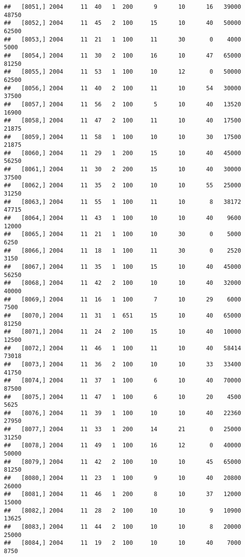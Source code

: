 \documentclass{article}\usepackage[]{graphicx}\usepackage[]{color}
\makeatletter
\newenvironment{kframe}{%
 \def\at@end@of@kframe{}%
 \ifinner\ifhmode%
  \def\at@end@of@kframe{\end{minipage}}%
  \begin{minipage}{\columnwidth}%
 \fi\fi%
 \def\FrameCommand##1{\hskip\@totalleftmargin \hskip-\fboxsep
 \colorbox{shadecolor}{##1}\hskip-\fboxsep
     \hskip-\linewidth \hskip-\@totalleftmargin \hskip\columnwidth}%
 \MakeFramed {\advance\hsize-\width
   \@totalleftmargin\z@ \linewidth\hsize
   \@setminipage}}%
 {\par\unskip\endMakeFramed%
 \at@end@of@kframe}
\newenvironment{knitrout}{}{} %
\makeatother
\begin{document}
\begin{knitrout}
\begin{kframe}
\begin{verbatim}
##   [8051,] 2004     11  40   1  200      9      10      16   39000   48750
##   [8052,] 2004     11  45   2  100     15      10      40   50000   62500
##   [8053,] 2004     11  21   1  100     11      30       0    4000    5000
##   [8054,] 2004     11  30   2  100     16      10      47   65000   81250
##   [8055,] 2004     11  53   1  100     10      12       0   50000   62500
##   [8056,] 2004     11  40   2  100     11      10      54   30000   37500
##   [8057,] 2004     11  56   2  100      5      10      40   13520   16900
##   [8058,] 2004     11  47   2  100     11      10      40   17500   21875
##   [8059,] 2004     11  58   1  100     10      10      30   17500   21875
##   [8060,] 2004     11  29   1  200     15      10      40   45000   56250
##   [8061,] 2004     11  30   2  200     15      10      40   30000   37500
##   [8062,] 2004     11  35   2  100     10      10      55   25000   31250
##   [8063,] 2004     11  55   1  100     11      10       8   38172   47715
##   [8064,] 2004     11  43   1  100     10      10      40    9600   12000
##   [8065,] 2004     11  21   1  100     10      30       0    5000    6250
##   [8066,] 2004     11  18   1  100     11      30       0    2520    3150
##   [8067,] 2004     11  35   1  100     15      10      40   45000   56250
##   [8068,] 2004     11  42   2  100     10      10      40   32000   40000
##   [8069,] 2004     11  16   1  100      7      10      29    6000    7500
##   [8070,] 2004     11  31   1  651     15      10      40   65000   81250
##   [8071,] 2004     11  24   2  100     15      10      40   10000   12500
##   [8072,] 2004     11  46   1  100     11      10      40   58414   73018
##   [8073,] 2004     11  36   2  100     10      10      33   33400   41750
##   [8074,] 2004     11  37   1  100      6      10      40   70000   87500
##   [8075,] 2004     11  47   1  100      6      10      20    4500    5625
##   [8076,] 2004     11  39   1  100     10      10      40   22360   27950
##   [8077,] 2004     11  33   1  200     14      21       0   25000   31250
##   [8078,] 2004     11  49   1  100     16      12       0   40000   50000
##   [8079,] 2004     11  42   2  100     10      10      45   65000   81250
##   [8080,] 2004     11  23   1  100      9      10      40   20800   26000
##   [8081,] 2004     11  46   1  200      8      10      37   12000   15000
##   [8082,] 2004     11  28   2  100     10      10       9   10900   13625
##   [8083,] 2004     11  44   2  100     10      10       8   20000   25000
##   [8084,] 2004     11  19   2  100     10      10      40    7000    8750

\end{verbatim}
\end{kframe}
\end{knitrout}
\end{document}

